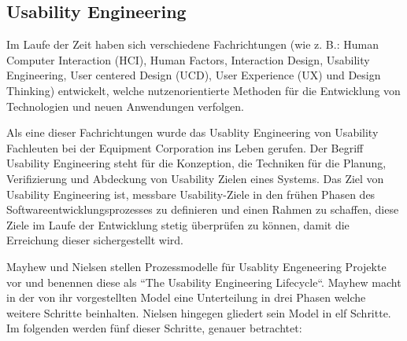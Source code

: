 \subsection{Usability Engineering}\label{UsaEng}

\cite[S.~7]{MichaelRichter2016} Im Laufe der Zeit haben sich verschiedene Fachrichtungen (wie z. B.: Human Computer Interaction (HCI), Human Factors, Interaction Design, Usability Engineering, 
User centered Design (UCD), User Experience (UX) und Design Thinking) entwickelt, welche nutzenorientierte Methoden für die Entwicklung von Technologien und neuen Anwendungen verfolgen. 

\cite[S.~14]{MaryBethRossonJohnM.CarrollDianeD.Cerra2002} Als eine dieser Fachrichtungen wurde das Usablity Engineering von Usability Fachleuten bei der Equipment Corporation ins Leben gerufen.  
Der Begriff Usability Engineering steht für die Konzeption, die Techniken für die Planung, Verifizierung und Abdeckung von Usability Zielen eines Systems. Das Ziel von Usability Engineering ist, 
messbare Usability-Ziele in den frühen Phasen des Softwareentwicklungsprozesses zu definieren und einen Rahmen zu schaffen, diese Ziele im Laufe der Entwicklung stetig überprüfen zu können, damit die Erreichung dieser sichergestellt wird.

Mayhew \cite{Mayhew1999} und Nielsen \cite{Nielsen1994} stellen Prozessmodelle für Usablity Engeneering Projekte vor und benennen diese als ``The Usability Engineering Lifecycle``. Mayhew macht in der von ihr vorgestellten Model eine Unterteilung in drei Phasen welche weitere Schritte beinhalten. Nielsen hingegen gliedert sein Model in elf Schritte. Im folgenden werden fünf 
dieser Schritte, genauer betrachtet: 


